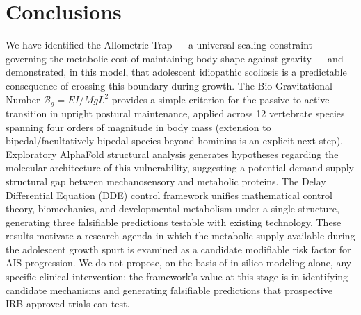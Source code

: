 \section{Conclusions}

We have identified the Allometric Trap --- a universal scaling constraint governing the metabolic cost of maintaining body shape against gravity --- and demonstrated, in this model, that adolescent idiopathic scoliosis is a predictable consequence of crossing this boundary during growth. The Bio-Gravitational Number $\mathcal{B}_g = EI/MgL^2$ provides a simple criterion for the passive-to-active transition in upright postural maintenance, applied across 12 vertebrate species spanning four orders of magnitude in body mass (extension to bipedal/facultatively-bipedal species beyond hominins is an explicit next step). Exploratory AlphaFold structural analysis generates hypotheses regarding the molecular architecture of this vulnerability, suggesting a potential demand-supply structural gap between mechanosensory and metabolic proteins. The Delay Differential Equation (DDE) control framework unifies mathematical control theory, biomechanics, and developmental metabolism under a single structure, generating three falsifiable predictions testable with existing technology. These results motivate a research agenda in which the metabolic supply available during the adolescent growth spurt is examined as a candidate modifiable risk factor for AIS progression. We do not propose, on the basis of in-silico modeling alone, any specific clinical intervention; the framework's value at this stage is in identifying candidate mechanisms and generating falsifiable predictions that prospective IRB-approved trials can test.
